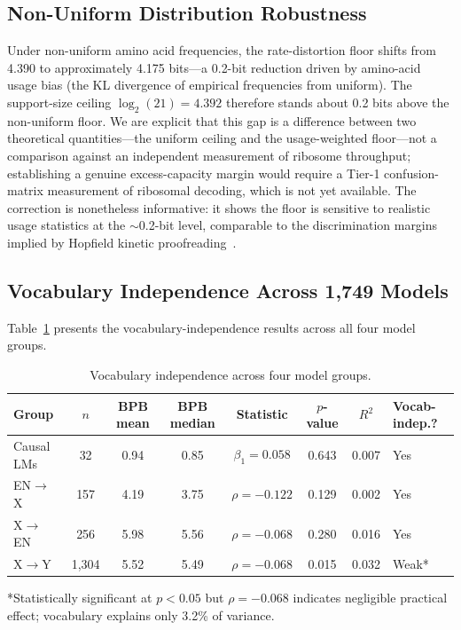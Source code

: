 \documentclass[11pt]{article}
\begin{document}
\subsection{Non-Uniform Distribution Robustness}

Under non-uniform amino acid frequencies, the rate-distortion floor shifts from 4.390 to approximately 4.175 bits---a 0.2-bit reduction driven by amino-acid usage bias (the KL divergence of empirical frequencies from uniform). The support-size ceiling $\log_2(21) = 4.392$ therefore stands about 0.2 bits above the non-uniform floor. We are explicit that this gap is a difference between two theoretical quantities---the uniform ceiling and the usage-weighted floor---not a comparison against an independent measurement of ribosome throughput; establishing a genuine excess-capacity margin would require a Tier-1 confusion-matrix measurement of ribosomal decoding, which is not yet available. The correction is nonetheless informative: it shows the floor is sensitive to realistic usage statistics at the $\sim$0.2-bit level, comparable to the discrimination margins implied by Hopfield kinetic proofreading~\cite{hopfield1974}.

\subsection{Vocabulary Independence Across 1,749 Models}

Table~\ref{tab:vocab_independence} presents the vocabulary-independence results across all four model groups.

\begin{table}[ht]
\centering
\caption{Vocabulary independence across four model groups.}
\label{tab:vocab_independence}
\begin{tabular}{lccccccl}
\toprule
Group & $n$ & BPB mean & BPB median & Statistic & $p$-value & $R^2$ & Vocab-indep.? \\
\midrule
Causal LMs & 32 & 0.94 & 0.85 & $\beta_1 = 0.058$ & 0.643 & 0.007 & Yes \\
EN$\to$X & 157 & 4.19 & 3.75 & $\rho = -0.122$ & 0.129 & 0.002 & Yes \\
X$\to$EN & 256 & 5.98 & 5.56 & $\rho = -0.068$ & 0.280 & 0.016 & Yes \\
X$\to$Y & 1,304 & 5.52 & 5.49 & $\rho = -0.068$ & 0.015 & 0.032 & Weak* \\
\bottomrule
\end{tabular}

\smallskip
\noindent\footnotesize{*Statistically significant at $p < 0.05$ but $\rho = -0.068$ indicates negligible practical effect; vocabulary explains only 3.2\% of variance.}
\end{table}
\end{document}
